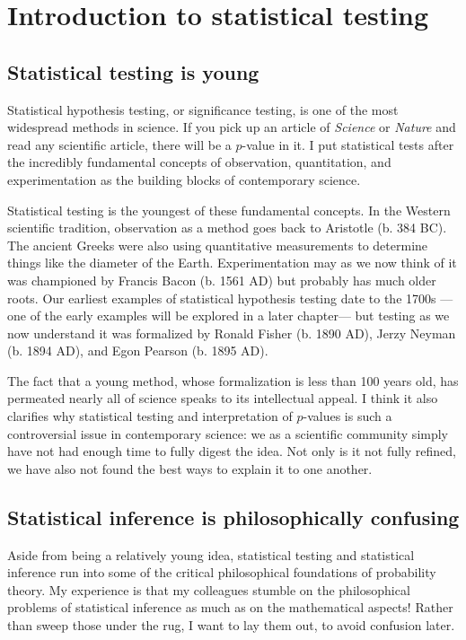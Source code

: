 
\chapter{Introduction to statistical testing}

\section{Statistical testing is young}

Statistical hypothesis testing, or significance testing, is one of the most
widespread methods in science. If you pick up an article of \textit{Science} or
\textit{Nature} and read any scientific article, there will be a $p$-value in
it. I put statistical tests after the incredibly fundamental concepts of
observation, quantitation, and experimentation as the building blocks of
contemporary science.

Statistical testing is the youngest of these fundamental concepts. In the
Western scientific tradition, observation as a method goes back to Aristotle
(b. 384 BC). The ancient Greeks were also using quantitative measurements to
determine things like the diameter of the Earth. Experimentation may as we now
think of it was championed by Francis Bacon (b. 1561 AD) but probably has much
older roots. Our earliest examples of statistical hypothesis testing date to
the 1700s ---one of the early examples will be explored in a later chapter---
but testing as we now understand it was formalized by Ronald Fisher (b. 1890
AD), Jerzy Neyman (b. 1894 AD), and Egon Pearson (b. 1895 AD).

The fact that a young method, whose formalization is less than 100 years old,
has permeated nearly all of science speaks to its intellectual appeal. I think
it also clarifies why statistical testing and interpretation of $p$-values is
such a controversial issue in contemporary science: we as a scientific
community simply have not had enough time to fully digest the idea. Not only is
it not fully refined, we have also not found the best ways to explain it to one
another.

\section{Statistical inference is philosophically confusing}

Aside from being a relatively young idea, statistical testing and
statistical inference run into some of the critical philosophical
foundations of probability theory. My experience is that my colleagues
stumble on the philosophical problems of statistical inference as much as
on the mathematical aspects! Rather than sweep those under the rug, I want
to lay them out, to avoid confusion later.

